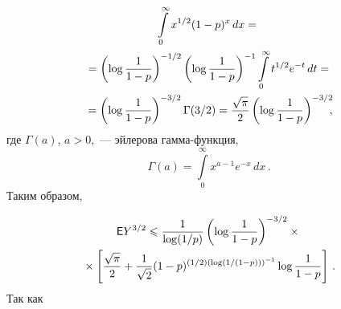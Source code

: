 \begin{multicols}{2}
\noindent
\begin{multline*}
 \int\limits_{0}^\infty x^{1/2}(1-p)^x\, dx
={}\\
{}=
 \left(\log\fr{1}{1-p}\right)^{-1/2}
\left(\log\fr{1}{1-p}\right)^{-1} \int\limits_{0}^\infty
t^{{1}/{2}}e^{-t}\, dt ={}\\
{}=
\left(\log\fr{1}{1-p}\right)^{-3/2}\Gamma(3/2) =
\fr{\sqrt{\pi}}{2}\left(\log\fr{1}{1-p}\right)^{-3/2}\!\!\!,
\end{multline*}
где $\Gamma(a)$, $a>0$,~--- эйлерова гамма-функция,
$$
\Gamma(a)=\int\limits_{0}^{\infty}x^{a-1}e^{-x}\,dx\,.
$$
Таким образом,

\noindent
\begin{multline*}
 \e Y^{3/2} \leqslant
\fr{1}{\log({1}/{p})}\left(\log\fr{1}{1-p}\right)^{-3/2}\times{}\\
{}\times
\left[\fr{\sqrt{\pi}}{2}+\fr{1}{\sqrt{2}}(1-p)^{(1/2)\left(\log (1/(1-p))\right)^{-1}}
\log\fr{1}{1-p} \right]\,.
\end{multline*}
Так как


\end{multicols}
